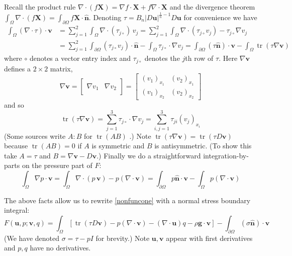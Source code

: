 \documentclass[letterpaper,final,12pt,reqno]{amsart}
\newcommand{\grad}{\nabla}
\newcommand{\trace}{\operatorname{tr}}
\newcommand{\hbn}{\hat{\mathbf{n}}}
\newcommand{\bu}{\mathbf{u}}
\newcommand{\bv}{\mathbf{v}}
\newcommand{\bX}{\mathbf{X}}
\begin{document}
Recall the product rule $\nabla \cdot(f\bX) = \grad f\cdot \bX + f \nabla \cdot \bX$ and the divergence theorem $\int_\Omega \nabla \cdot (f\bX) = \int_{\partial \Omega} f\bX \cdot \hbn$.  Denoting $\tau = B_n |D\bu|^{\frac{1}{n} - 1} D\bu$ for convenience we have
\begin{align*}
\int_\Omega \left(\nabla \cdot \tau\right)\cdot \bv &= \sum_{j=1}^2 \int_\Omega \nabla \cdot (\tau_{j\circ})\, v_j = \sum_{j=1}^2 \int_\Omega \nabla \cdot (\tau_{j\circ} v_j) - \tau_{j\circ} \nabla v_j \\
  &= \sum_{j=1}^2 \int_{\partial \Omega} (\tau_{j\circ} v_j) \cdot \hbn - \int_\Omega \tau_{j\circ} \cdot \nabla v_j = \int_{\partial \Omega} (\tau \hbn)\cdot \bv - \int_\Omega \trace(\tau \nabla \bv)
\end{align*}
where $\circ$ denotes a vector entry index and $\tau_{j\circ}$ denotes the $j$th row of $\tau$.  Here $\grad\bv$ defines a $2\times 2$ matrix,
\newcommand{\treftwo}[2]{\left[\begin{array}{c|c} & \\ #1 & #2 \\ & \end{array}\right]}
\newcommand{\trefthree}[3]{\left[\begin{array}{c|c|c} & & \\ #1 & #2 & #3 \\ & & \end{array}\right]}
    $$\grad \bv = \treftwo{\grad v_1}{\grad v_2} = \begin{bmatrix}
    (v_1)_{x_1} & (v_2)_{x_1} \\
    (v_1)_{x_2} & (v_2)_{x_2}
    \end{bmatrix}$$
and so
    $$\trace(\tau \grad \bv) = \sum_{j=1}^3 \tau_{j\circ} \cdot \grad v_j = \sum_{i,j=1}^3 \tau_{ji} (v_j)_{x_i}$$
(Some sources write $A:B$ for $\trace(AB)$ \cite{JouvetRappaz2011}.)  Note $\trace(\tau \grad \bv) = \trace(\tau D\bv)$ because $\trace(AB)=0$ if $A$ is symmetric and $B$ is antisymmetric.  (To show this take $A=\tau$ and $B=\grad\bv-D\bv$.)  Finally we do a straightforward integration-by-parts on the pressure part of $F$:
    $$\int_\Omega \nabla p \cdot \bv = \int_\Omega \nabla\cdot (p\,\bv) - p (\nabla \cdot \bv) = \int_{\partial \Omega} p\hbn \cdot \bv - \int_\Omega p (\nabla \cdot \bv)$$

The above facts allow us to rewrite \eqref{nonfuncone} with a normal stress boundary integral:
\begin{equation}
F(\bu,p;\bv,q) =  \int_\Omega \left[\trace(\tau D\bv) - p (\nabla \cdot \bv) - \left(\nabla \cdot \bu\right) q - \rho \mathbf{g} \cdot \bv\right] - \int_{\partial\Omega} (\sigma \hbn)\cdot \bv \label{nonfunctwo}
\end{equation}
(We have denoted $\sigma=\tau-pI$ for brevity.)  Note $\bu,\bv$ appear with first derivatives and $p,q$ have no derivatives.
\end{document}
